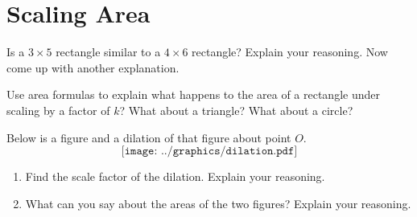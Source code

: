 \newpage
\section{Scaling Area}


\begin{prob}
Is a $3\times 5$ rectangle similar to a $4\times 6$ rectangle?  Explain your reasoning.  Now come up with another explanation. 
\end{prob}

\vspace{.5in} 

\begin{prob}
Use area formulas to explain what happens to the area of a rectangle under scaling by a factor of $k$?  What about a triangle?  What about a circle?  
\end{prob}

\begin{prob}
Below is a figure and a dilation of that figure about point $O$.  
\[
\texttt{[image: ../graphics/dilation.pdf]}
\]
\begin{enumerate}
\item Find the scale factor of the dilation.  Explain your reasoning. 
\item What can you say about the areas of the two figures?  Explain your reasoning. 
\end{enumerate}
\end{prob}



